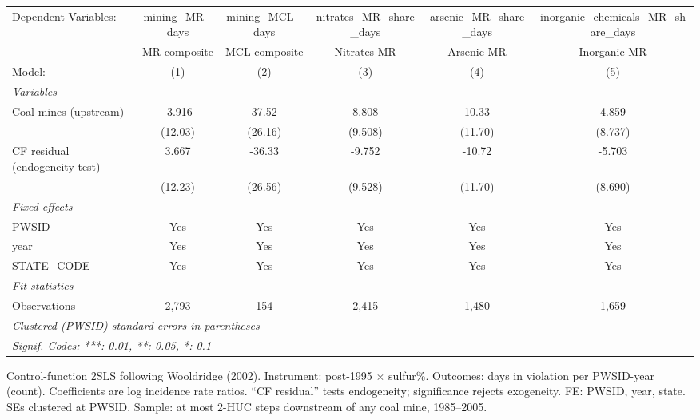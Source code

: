 
\begingroup
\centering
\begin{tabular}{lccccc}
   \tabularnewline \midrule \midrule
   Dependent Variables:           & mining\_MR\_days   & mining\_MCL\_days   & nitrates\_MR\_share\_days    & arsenic\_MR\_share\_days    & inorganic\_chemicals\_MR\_share\_days\\      
                                  & MR composite       & MCL composite       & Nitrates MR                  & Arsenic MR                  & Inorganic MR \\   
   Model:                         & (1)                & (2)                 & (3)                          & (4)                         & (5)\\  
   \midrule
   \emph{Variables}\\
   Coal mines (upstream)          & -3.916             & 37.52               & 8.808                        & 10.33                       & 4.859\\   
                                  & (12.03)            & (26.16)             & (9.508)                      & (11.70)                     & (8.737)\\   
   CF residual (endogeneity test) & 3.667              & -36.33              & -9.752                       & -10.72                      & -5.703\\   
                                  & (12.23)            & (26.56)             & (9.528)                      & (11.70)                     & (8.690)\\   
   \midrule
   \emph{Fixed-effects}\\
   PWSID                          & Yes                & Yes                 & Yes                          & Yes                         & Yes\\  
   year                           & Yes                & Yes                 & Yes                          & Yes                         & Yes\\  
   STATE\_CODE                    & Yes                & Yes                 & Yes                          & Yes                         & Yes\\  
   \midrule
   \emph{Fit statistics}\\
   Observations                   & 2,793              & 154                 & 2,415                        & 1,480                       & 1,659\\  
   \midrule \midrule
   \multicolumn{6}{l}{\emph{Clustered (PWSID) standard-errors in parentheses}}\\
   \multicolumn{6}{l}{\emph{Signif. Codes: ***: 0.01, **: 0.05, *: 0.1}}\\
\end{tabular}
 
\par \raggedright 
Control-function 2SLS following Wooldridge (2002). Instrument: post-1995 $\times$ sulfur\%. Outcomes: days in violation per PWSID-year (count). Coefficients are log incidence rate ratios. ``CF residual'' tests endogeneity; significance rejects exogeneity. FE: PWSID, year, state. SEs clustered at PWSID. Sample: at most 2-HUC steps downstream of any coal mine, 1985--2005.
\par\endgroup


